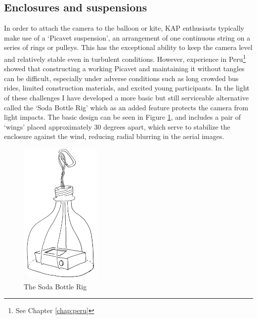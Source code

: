 \documentclass[11pt,oneside,notitlepage]{report}
\begin{document}
{{\subsection{Enclosures and suspensions}
\label{subsec:cameraenclosures}

In order to attach the camera to the balloon or kite, \ac{KAP} enthusiasts typically make use of a `Picavet suspension', an arrangement of one continuous string on a series of rings or pulleys. This has the exceptional ability to keep the camera level and relatively stable even in turbulent conditions. However, experience in Peru\footnote{See Chapter \ref{chap:peru}} showed that constructing a working Picavet and maintaining it without tangles can be difficult, especially under adverse conditions such as long crowded bus rides, limited construction materials, and excited young participants. In the light of these challenges I have developed a more basic but still serviceable alternative called the `Soda Bottle Rig' which as an added feature protects the camera from light impacts. The basic design can be seen in Figure \ref{fig:soda}, and includes a pair of `wings' placed approximately 30 degrees apart, which serve to stabilize the enclosure against the wind, reducing radial blurring in the aerial images.

\begin{figure}
	\label{fig:soda}
	\begin{flushright}
		\includegraphics[width=0.35\textwidth]{images/soda-bottle-overview.jpg}
		\caption{The Soda Bottle Rig}
	\end{flushright}
\end{figure}

}}
\end{document}
